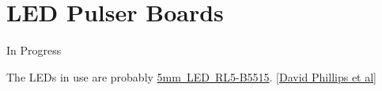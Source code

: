
\section{LED Pulser Boards}
\label{sec:eq_led}

{\centering\Huge In Progress}

The LEDs in use are probably \href{http://www.superbrightleds.com/cgi-bin/store/index.cgi?action=DispPage\&Page2Disp=/specs/b2\_specs.htm}{5mm~LED~RL5-B5515}. [\href{papers/newvptpaper}{David Phillips et al}]


